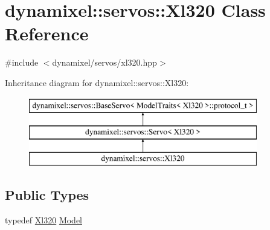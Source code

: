 \hypertarget{classdynamixel_1_1servos_1_1_xl320}{}\section{dynamixel\+:\+:servos\+:\+:Xl320 Class Reference}
\label{classdynamixel_1_1servos_1_1_xl320}


{\ttfamily \#include $<$dynamixel/servos/xl320.\+hpp$>$}

Inheritance diagram for dynamixel\+:\+:servos\+:\+:Xl320\+:\begin{figure}[H]
\begin{center}
\leavevmode
\includegraphics[height=3.000000cm]{classdynamixel_1_1servos_1_1_xl320}
\end{center}
\end{figure}
\subsection*{Public Types}
\begin{DoxyCompactItemize}
\item 
typedef \hyperlink{classdynamixel_1_1servos_1_1_xl320}{Xl320} \hyperlink{classdynamixel_1_1servos_1_1_xl320_aa84b4fd645caf735df673765cc78ccd1}{Model}
\end{DoxyCompactItemize}
